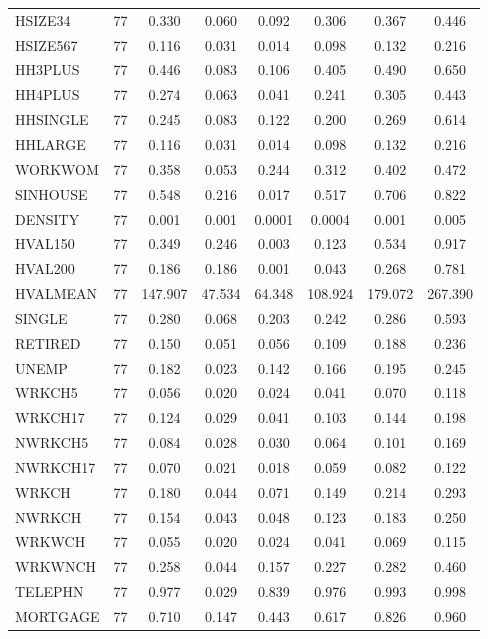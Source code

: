 \documentclass[
]{article}
\begin{document}
\begin{table}[!htbp]
\begin{tabular}{@{\extracolsep{5pt}}lccccccc}
HSIZE34 & 77 & 0.330 & 0.060 & 0.092 & 0.306 & 0.367 & 0.446 \\ 
HSIZE567 & 77 & 0.116 & 0.031 & 0.014 & 0.098 & 0.132 & 0.216 \\ 
HH3PLUS & 77 & 0.446 & 0.083 & 0.106 & 0.405 & 0.490 & 0.650 \\ 
HH4PLUS & 77 & 0.274 & 0.063 & 0.041 & 0.241 & 0.305 & 0.443 \\ 
HHSINGLE & 77 & 0.245 & 0.083 & 0.122 & 0.200 & 0.269 & 0.614 \\ 
HHLARGE & 77 & 0.116 & 0.031 & 0.014 & 0.098 & 0.132 & 0.216 \\ 
WORKWOM & 77 & 0.358 & 0.053 & 0.244 & 0.312 & 0.402 & 0.472 \\ 
SINHOUSE & 77 & 0.548 & 0.216 & 0.017 & 0.517 & 0.706 & 0.822 \\ 
DENSITY & 77 & 0.001 & 0.001 & 0.0001 & 0.0004 & 0.001 & 0.005 \\ 
HVAL150 & 77 & 0.349 & 0.246 & 0.003 & 0.123 & 0.534 & 0.917 \\ 
HVAL200 & 77 & 0.186 & 0.186 & 0.001 & 0.043 & 0.268 & 0.781 \\ 
HVALMEAN & 77 & 147.907 & 47.534 & 64.348 & 108.924 & 179.072 & 267.390 \\ 
SINGLE & 77 & 0.280 & 0.068 & 0.203 & 0.242 & 0.286 & 0.593 \\ 
RETIRED & 77 & 0.150 & 0.051 & 0.056 & 0.109 & 0.188 & 0.236 \\ 
UNEMP & 77 & 0.182 & 0.023 & 0.142 & 0.166 & 0.195 & 0.245 \\ 
WRKCH5 & 77 & 0.056 & 0.020 & 0.024 & 0.041 & 0.070 & 0.118 \\ 
WRKCH17 & 77 & 0.124 & 0.029 & 0.041 & 0.103 & 0.144 & 0.198 \\ 
NWRKCH5 & 77 & 0.084 & 0.028 & 0.030 & 0.064 & 0.101 & 0.169 \\ 
NWRKCH17 & 77 & 0.070 & 0.021 & 0.018 & 0.059 & 0.082 & 0.122 \\ 
WRKCH & 77 & 0.180 & 0.044 & 0.071 & 0.149 & 0.214 & 0.293 \\ 
NWRKCH & 77 & 0.154 & 0.043 & 0.048 & 0.123 & 0.183 & 0.250 \\ 
WRKWCH & 77 & 0.055 & 0.020 & 0.024 & 0.041 & 0.069 & 0.115 \\ 
WRKWNCH & 77 & 0.258 & 0.044 & 0.157 & 0.227 & 0.282 & 0.460 \\ 
TELEPHN & 77 & 0.977 & 0.029 & 0.839 & 0.976 & 0.993 & 0.998 \\ 
MORTGAGE & 77 & 0.710 & 0.147 & 0.443 & 0.617 & 0.826 & 0.960 \\ 

\end{tabular}
\end{table}
\end{document}
